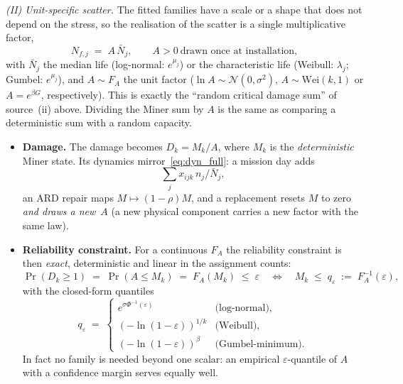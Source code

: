 \documentclass[11pt,a4paper]{article}
\theoremstyle{plain}
\theoremstyle{definition}
\theoremstyle{remark}
\begin{document}
\emph{(II) Unit-specific scatter.}
The fitted families have a scale or a shape that does not depend on the stress, so the realisation of the scatter is a single multiplicative factor,
\begin{equation}\label{eq:miner_unit}
  N_{f,j} \;=\; A\,\bar N_j, \qquad A > 0 \ \text{drawn once at installation},
\end{equation}
with $\bar N_j$ the median life (log-normal: $e^{\mu_j}$) or the characteristic life (Weibull: $\lambda_j$; Gumbel: $e^{\mu_j}$), and $A \sim F_A$ the unit factor ($\ln A \sim \mathcal{N}(0,\sigma^2)$, $A \sim \mathrm{Wei}(k,1)$ or $A = e^{\beta G}$, respectively).
This is exactly the ``random critical damage sum'' of source~(ii) above.
Dividing the Miner sum by $A$ is the same as comparing a deterministic sum with a random capacity.
\begin{itemize}
  \item \textbf{Damage.} The damage becomes $D_k = M_k / A$, where $M_k$ is the \emph{deterministic} Miner state.
    Its dynamics mirror~\eqref{eq:dyn_full}: a mission day adds
    \begin{equation}
      \sum_j x_{ijk}\, n_j/\bar N_j,
    \end{equation}
    an ARD repair maps $M \mapsto (1-\rho)M$, and a replacement resets $M$ to zero \emph{and draws a new}~$A$ (a new physical component carries a new factor with the same law).
  \item \textbf{Reliability constraint.} For a continuous $F_A$ the reliability constraint is then \emph{exact}, deterministic and linear in the assignment counts:
\begin{equation}\label{eq:miner_quantile}
  \Pr(D_k \ge 1) \;=\; \Pr(A \le M_k) \;=\; F_A(M_k) \;\le\; \varepsilon
  \quad\Longleftrightarrow\quad
  M_k \;\le\; q_\varepsilon \;:=\; F_A^{-1}(\varepsilon),
\end{equation}
    with the closed-form quantiles
    \begin{equation}
      q_\varepsilon \;=\;
      \begin{cases}
        e^{\sigma\Phi^{-1}(\varepsilon)} & \text{(log-normal)},\\[3pt]
        (-\ln(1-\varepsilon))^{1/k} & \text{(Weibull)},\\[3pt]
        (-\ln(1-\varepsilon))^{\beta} & \text{(Gumbel-minimum)}.
      \end{cases}
    \end{equation}
    In fact no family is needed beyond one scalar: an empirical $\varepsilon$-quantile of $A$ with a confidence margin serves equally well.

\end{itemize}
\end{document}
